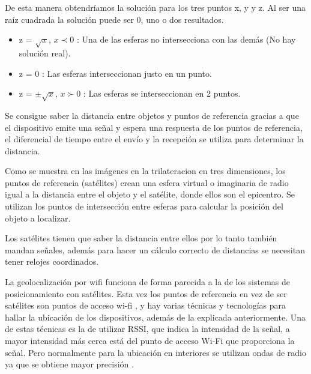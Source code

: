 De esta manera obtendríamos la solución para los tres puntos x, y y z. Al ser una raíz cuadrada la solución puede ser 0, uno o dos resultados.

\begin{itemize}
\item 
	z = $\sqrt{x}$, $x \prec 0$ : Una de las esferas no intersecciona con las demás (No hay solución real).
\item 
	z = 0 : Las esferas interseccionan justo en un punto.
\item 
	z = $\pm\sqrt{x}$, $x \succ 0$ : Las esferas se interseccionan en 2 puntos.
	
\end{itemize}

Se consigue saber la distancia entre objetos y puntos de referencia gracias a que el dispositivo emite una señal y espera una respuesta de los puntos de referencia, el diferencial de tiempo entre el envío y la recepción se utiliza para determinar la distancia.

Como se muestra en las imágenes en la trilateracion en tres dimensiones, los puntos de referencia (satélites) crean una esfera virtual o imaginaria de radio igual a la distancia entre el objeto y el satélite, donde ellos son el epicentro. Se utilizan los puntos de intersección entre esferas para calcular la posición del objeto a localizar.

Los satélites tienen que saber la distancia entre ellos por lo tanto también mandan señales, además para hacer un cálculo correcto de distancias se necesitan tener relojes coordinados.
\\





La geolocalización por wifi funciona de forma parecida a la de los sistemas de posicionamiento con satélites. Esta vez los puntos de referencia en vez de ser satélites son puntos de acceso wi-fi \cite{luz_wi-fi_2017:a}, y hay varias técnicas y tecnologías para hallar la ubicación de los dispositivos, además de la explicada anteriormente. Una de estas técnicas es la de utilizar RSSI, que indica la intensidad de la señal, a mayor intensidad más cerca está del punto de acceso Wi-Fi que proporciona la señal.  Pero normalmente para la ubicación en interiores se utilizan ondas de radio ya que se obtiene mayor precisión \cite{noauthor_mejores_nodate:a}. 

